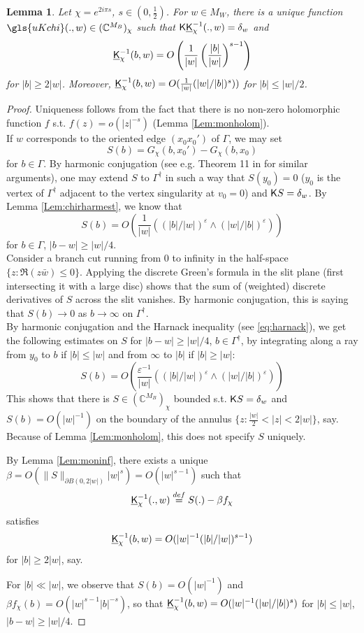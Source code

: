 \documentclass[10pt]{article}
\newcommand{\C}{\mathbb{C}}
\newcommand{\eps}{\varepsilon}
\newcommand{\rK}{{\sf K}}
\newcommand{\uK}{{\underline {\sf K}}}
\newcommand{\dg}{\dagger}
\newtheorem{Lem}[thm]{Lemma}
\begin{document}
\begin{Lem}\label{Lem:chirkernel0}
Let $\chi=e^{2i\pi s}$, $s\in(0,\frac 12)$. For $w\in M_W$, there is a unique function $\gls{uKchi}(.,w)\in (\C^{M_B})_\chi$ 
such that $\rK\uK^{-1}_\chi(.,w)=\delta_w$ and 
$$\uK^{-1}_\chi(b,w)=O\left(\frac {1}{|w|}\left(\frac{|b|}{|w|}\right)^{s-1}\right)$$
%
for $|b|\geq 2|w|$. Moreover,
$\uK^{-1}_\chi(b,w)=O(\frac {1}{|w|}(|w|/|b|)^{s}))$ for $|b|\leq |w|/2$.
\end{Lem}
\begin{proof}
Uniqueness follows from the fact that there is no non-zero holomorphic function $f$ s.t. $f(z)=o(|z|^{-s})$ (Lemma \ref{Lem:monholom}).\\
If $w$ corresponds to the oriented edge $(x_0x_0')$ of $\Gamma$, we may set
$$S(b)=G_\chi(b,x_0')-G_\chi(b,x_0)$$
for $b\in\Gamma$. By harmonic conjugation (see e.g. Theorem 11 in \cite{Ken_domino_conformal} for similar arguments), one may extend $S$ to $\Gamma^\dg$ in such a way that $S(y_0)=0$ ($y_0$ is the vertex of $\Gamma^\dg$ adjacent to the vertex singularity at $v_0=0$) and $\rK S=\delta_w$. By Lemma \ref{Lem:chirharmest}, we know that
$$S(b)=O(\frac 1{|w|}\left((|b|/|w|)^\eps\wedge (|w|/|b|)^\eps\right))$$
for $b\in\Gamma$, $|b-w|\geq |w|/4$.\\
Consider a branch cut running from $0$ to infinity in the half-space $\{z:\Re(z\bar w)\leq 0\}$. Applying the discrete Green's formula in the slit plane (first intersecting it with a large disc) shows that the sum of (weighted) discrete derivatives of $S$ across the slit vanishes. By harmonic conjugation, this is saying that $S(b)\rightarrow 0$ as $b\rightarrow\infty$ on $\Gamma^\dg$.\\
By harmonic conjugation and the Harnack inequality (see \eqref{eq:harnack}), we get the following estimates on $S$ for $|b-w|\geq |w|/4$, $b\in\Gamma^\dg$, by integrating along a ray from $y_0$ to $b$ if $|b|\leq |w|$ and from $\infty$ to $|b|$ if $|b|\geq |w|$:
$$S(b)=O(\frac {\eps^{-1}}{|w|}\left((|b|/|w|)^\eps\wedge(|w|/|b|)^\eps\right))$$
This shows that there is $S\in(\C^{M_B})_\chi$ bounded s.t. $\rK S=\delta_w$ and $S(b)=O(|w|^{-1})$ on the boundary of the annulus $\{z:\frac{|w|}2<|z|<2|w|\}$, say. Because of Lemma \ref{Lem:monholom}, this does not specify $S$ uniquely.

By Lemma \ref{Lem:moninf}, there exists a unique $\beta=O(\|S\|_{\partial B(0,2|w|)}|w|^s)=O(|w|^{s-1})$ such that 
$$\uK_\chi^{-1}(.,w)\stackrel{def}{=}S(.)-\beta f_\chi$$
satisfies
$$\uK_\chi^{-1}(b,w)=O(|w|^{-1}(|b|/|w|)^{s-1})$$
for $|b|\geq 2|w|$, say.

For $|b|\ll |w|$, we observe that $S(b)=O(|w|^{-1})$ and $\beta f_\chi(b)=O(|w|^{s-1}|b|^{-s})$, so that $\uK_\chi^{-1}(b,w)=O(|w|^{-1}(|w|/|b|)^s)$ for $|b|\leq |w|$, $|b-w|\geq|w|/4$.
\end{proof}
\end{document}
